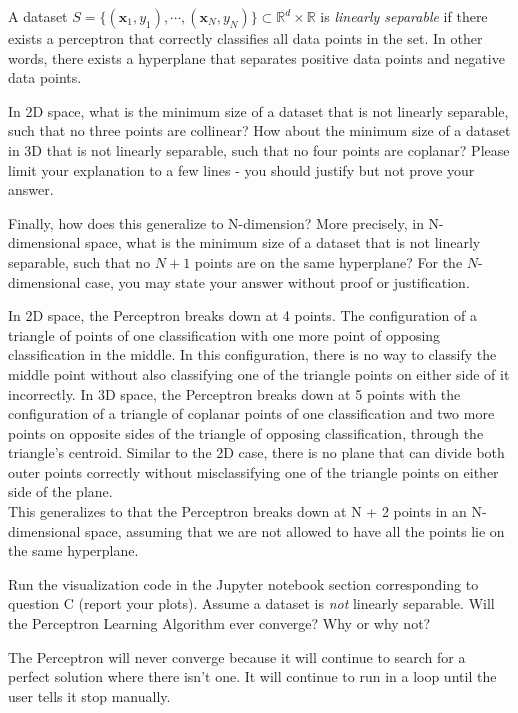 \begin{problem}[4]
  A dataset $S = \{(\mathbf{x}_1, y_1),\cdots,(\mathbf{x}_N, y_N)\} \subset \mathbb{R}^d \times \mathbb{R}$ is \emph{linearly separable} if there exists a perceptron that correctly classifies all data points in the set. In other words, there exists a hyperplane that separates positive data points and negative data points.

  In 2D space, what is the minimum size of a dataset that is not linearly separable, such that no three points are collinear? How about the minimum size of a dataset in 3D that is not linearly separable, such that no four points are coplanar? Please limit your explanation to a few lines - you should justify but not prove your answer.

  Finally, how does this generalize to N-dimension? More precisely, in N-dimensional space, what is the minimum size of a dataset that is not linearly separable, such that no $N+1$ points are on the same hyperplane? For the $N$-dimensional case, you may state your answer without proof or justification.
\end{problem}
\begin{solution}
  In 2D space, the Perceptron breaks down at 4 points. The configuration of a triangle of points of one classification with one more point of opposing classification in the middle. In this configuration, there is no way to classify the middle point without also classifying one of the triangle points on either side of it incorrectly. In 3D space, the Perceptron breaks down at 5 points with the configuration of a triangle of coplanar points of one classification and two more points on opposite sides of the triangle of opposing classification, through the triangle's centroid. Similar to the 2D case, there is no plane that can divide both outer points correctly without misclassifying one of the triangle points on either side of the plane.  \\
  This generalizes to that the Perceptron breaks down at N + 2 points in an N-dimensional space, assuming that we are not allowed to have all the points lie  on the same hyperplane.
\end{solution}

\begin{problem}[2]
  Run the visualization code in the Jupyter notebook section corresponding to question C (report your plots). Assume a dataset is \emph{not} linearly separable. Will the Perceptron Learning Algorithm ever converge? Why or why not?
\end{problem}
\begin{solution}
  The Perceptron will never converge because it will continue to search for a perfect solution where there isn't one. It will continue to run in a loop until the user tells it stop manually.
\end{solution}

